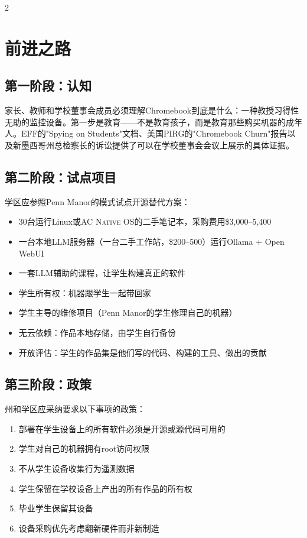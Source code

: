 \documentclass[11pt, a4paper]{article}
\newcommand{\acos}{\textsc{AC Native OS}}
\begin{document}
\begin{multicols}{2}
\section{前进之路}

\subsection{第一阶段：认知}

家长、教师和学校董事会成员必须理解Chromebook到底是什么：一种教授习得性无助的监控设备。第一步是教育——不是教育孩子，而是教育那些购买机器的成年人。EFF的"Spying on Students"文档、美国PIRG的"Chromebook Churn"报告以及新墨西哥州总检察长的诉讼提供了可以在学校董事会会议上展示的具体证据。

\subsection{第二阶段：试点项目}

学区应参照Penn Manor的模式试点开源替代方案：

\begin{itemize}
  \item 30台运行Linux或\acos{}的二手笔记本，采购费用\$3,000--5,400
  \item 一台本地LLM服务器（一台二手工作站，\$200--500）运行Ollama + Open WebUI
  \item 一套LLM辅助的课程，让学生构建真正的软件
  \item 学生所有权：机器跟学生一起带回家
  \item 学生主导的维修项目（Penn Manor的学生修理自己的机器）
  \item 无云依赖：作品本地存储，由学生自行备份
  \item 开放评估：学生的作品集是他们写的代码、构建的工具、做出的贡献
\end{itemize}

\subsection{第三阶段：政策}

州和学区应采纳要求以下事项的政策：

\begin{enumerate}
  \item 部署在学生设备上的所有软件必须是开源或源代码可用的
  \item 学生对自己的机器拥有root访问权限
  \item 不从学生设备收集行为遥测数据
  \item 学生保留在学校设备上产出的所有作品的所有权
  \item 毕业学生保留其设备
  \item 设备采购优先考虑翻新硬件而非新制造
\end{enumerate}


\end{multicols}
\end{document}
